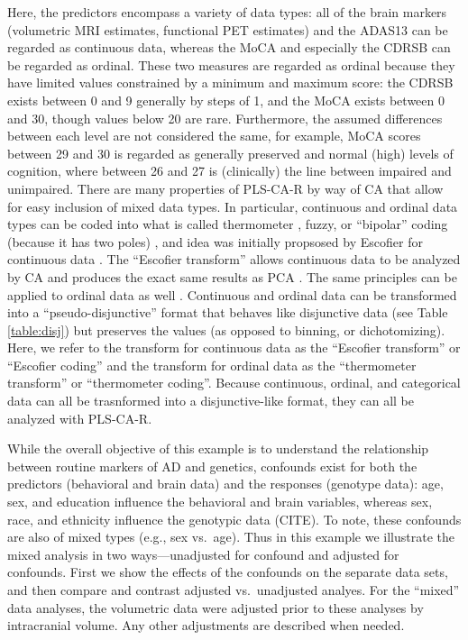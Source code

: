 \documentclass[12pt]{article}
\begin{document}
Here, the predictors encompass a variety of data types: all of the brain
markers (volumetric MRI estimates, functional PET estimates) and the
ADAS13 can be regarded as continuous data, whereas the MoCA and
especially the CDRSB can be regarded as ordinal. These two measures are
regarded as ordinal because they have limited values constrained by a
minimum and maximum score: the CDRSB exists between 0 and 9 generally by
steps of 1, and the MoCA exists between 0 and 30, though values below 20
are rare. Furthermore, the assumed differences between each level are
not considered the same, for example, MoCA scores between 29 and 30 is
regarded as generally preserved and normal (high) levels of cognition,
where between 26 and 27 is (clinically) the line between impaired and
unimpaired. There are many properties of PLS-CA-R by way of CA that
allow for easy inclusion of mixed data types. In particular, continuous
and ordinal data types can be coded into what is called thermometer
\citep{beaton2018generalization}, fuzzy, or ``bipolar'' coding (because
it has two poles) \citep{greenacrefuzzy}, and idea was initially
propsosed by Escofier for continuous data
\citep{escofier_traitement_1979}. The ``Escofier transform'' allows
continuous data to be analyzed by CA and produces the exact same results
as PCA \citep{escofier_traitement_1979}. The same principles can be
applied to ordinal data as well \citep{beaton2018generalization}.
Continuous and ordinal data can be transformed into a
``pseudo-disjunctive'' format that behaves like disjunctive data (see
Table \ref{table:disj}) but preserves the values (as opposed to binning,
or dichotomizing). Here, we refer to the transform for continuous data
as the ``Escofier transform'' or ``Escofier coding''
\citep{beaton_partial_2016} and the transform for ordinal data as the
``thermometer transform'' or ``thermometer coding''. Because continuous,
ordinal, and categorical data can all be trasnformed into a
disjunctive-like format, they can all be analyzed with PLS-CA-R.

While the overall objective of this example is to understand the
relationship between routine markers of AD and genetics, confounds exist
for both the predictors (behavioral and brain data) and the responses
(genotype data): age, sex, and education influence the behavioral and
brain variables, whereas sex, race, and ethnicity influence the
genotypic data (CITE). To note, these confounds are also of mixed types
(e.g., sex vs.~age). Thus in this example we illustrate the mixed
analysis in two ways---unadjusted for confound and adjusted for
confounds. First we show the effects of the confounds on the separate
data sets, and then compare and contrast adjusted vs.~unadjusted
analyes. For the ``mixed'' data analyses, the volumetric data were
adjusted prior to these analyses by intracranial volume. Any other
adjustments are described when needed.
\end{document}
